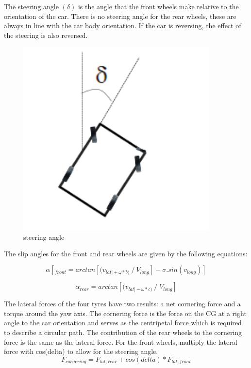 \documentclass{book}
\begin{document}
The steering angle $ (\delta) $ is the angle that the front wheels make relative to the orientation of the car. There is no steering angle for the rear wheels, these are always in line with the car body orientation. If the car is reversing, the effect of the steering is also reversed.
\begin{figure}[htbp]
  \centering
  \includegraphics[width=0.9\textwidth]{Steeringangle}
  \caption{steering angle}
\end{figure}

The slip angles for the front and rear wheels are given by the following equations:

\begin{equation}
\alpha[_{front} = arctan[(v_{lat] + \omega *b)}\: / \: V_{long}]- \sigma. sin(v_{long})]
\end{equation}

\begin{equation}
 \alpha_{rear} = arctan[(v_{lat] - \omega * c)}\: / \; V_{long}]
\end{equation}

The lateral forces of the four tyres have two results: a net cornering force and a torque around the yaw axis.  The cornering force is the force on the CG at a right angle to the car orientation and serves as the centripetal force which is required to describe a circular path.  The contribution of the rear wheels to the cornering force is the same as the lateral force.  For the front wheels, multiply the lateral force with cos(delta) to allow for the steering angle.
\begin{equation}
  F_{cornering} = F_{lat, rear} + cos(delta) * F_{lat, front}
\end{equation}
\end{document}
